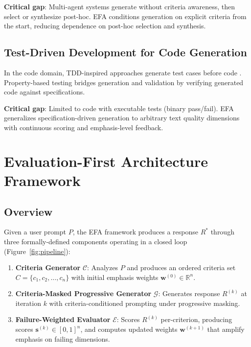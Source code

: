 \documentclass[11pt]{article}
\newcommand{\efa}{\textsc{EFA}}  %
\newcommand{\R}{\mathbb{R}}
\newcommand{\calC}{\mathcal{C}}
\newcommand{\calG}{\mathcal{G}}
\newcommand{\calE}{\mathcal{E}}
\begin{document}
\textbf{Critical gap}: Multi-agent systems generate without criteria awareness, then select or synthesize post-hoc. \efa{} conditions generation on explicit criteria from the start, reducing dependence on post-hoc selection and synthesis.

\subsection{Test-Driven Development for Code Generation}

In the code domain, TDD-inspired approaches generate test cases before code \citep{ravi2025llmloop}. Property-based testing bridges generation and validation by verifying generated code against specifications.

\textbf{Critical gap}: Limited to code with executable tests (binary pass/fail). \efa{} generalizes specification-driven generation to arbitrary text quality dimensions with continuous scoring and emphasis-level feedback.

\section{Evaluation-First Architecture Framework}
\label{sec:method}

\subsection{Overview}

Given a user prompt $P$, the \efa{} framework produces a response $R^*$ through three formally-defined components operating in a closed loop (Figure~\ref{fig:pipeline}):

\begin{enumerate}[leftmargin=*]
    \item \textbf{Criteria Generator} $\calC$: Analyzes $P$ and produces an ordered criteria set $C = \{c_1, c_2, \ldots, c_n\}$ with initial emphasis weights $\mathbf{w}^{(0)} \in \R^n$.
    \item \textbf{Criteria-Masked Progressive Generator} $\calG$: Generates response $R^{(k)}$ at iteration $k$ with criteria-conditioned prompting under progressive masking.
    \item \textbf{Failure-Weighted Evaluator} $\calE$: Scores $R^{(k)}$ per-criterion, producing scores $\mathbf{s}^{(k)} \in [0,1]^n$, and computes updated weights $\mathbf{w}^{(k+1)}$ that amplify emphasis on failing dimensions.
\end{enumerate}
\end{document}
